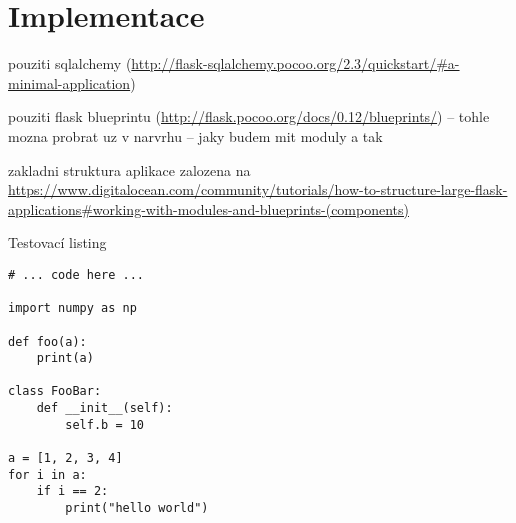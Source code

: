 \chapter{Implementace}
\label{sec:im}

pouziti sqlalchemy (\url{http://flask-sqlalchemy.pocoo.org/2.3/quickstart/#a-minimal-application})

pouziti flask blueprintu (\url{http://flask.pocoo.org/docs/0.12/blueprints/}) -- tohle mozna probrat uz v narvrhu -- jaky budem mit moduly a tak

zakladni struktura aplikace zalozena na \url{https://www.digitalocean.com/community/tutorials/how-to-structure-large-flask-applications#working-with-modules-and-blueprints-(components)}

\begin{listing}[htbp]
\caption{\label{code:foo} Testovací listing}
\begin{verbatim}
# ... code here ...

import numpy as np

def foo(a):
    print(a)

class FooBar:
    def __init__(self):
        self.b = 10

a = [1, 2, 3, 4]
for i in a:
    if i == 2:
        print("hello world")
\end{verbatim}
\end{listing}